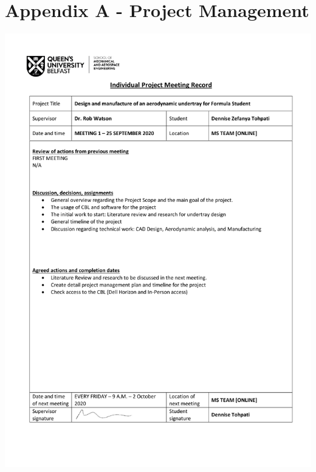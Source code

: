 \newpage
\section*{Appendix A - Project Management} 
\centering
\includegraphics[scale=0.8]{Content/Meeting minutes/MM1.pdf}